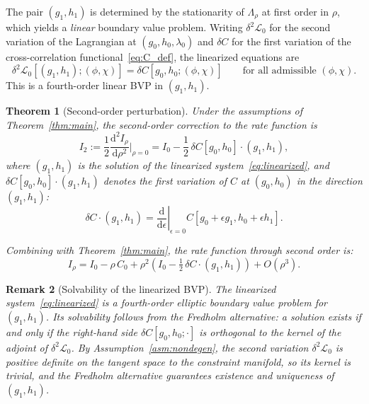 \documentclass[11pt]{article}
\newtheorem{theorem}{Theorem}
\newtheorem{remark}[theorem]{Remark}
\theoremstyle{definition}
\newcommand{\dd}{\mathrm{d}}
\begin{document}
The pair $(g_1, h_1)$ is determined by the stationarity of $\Lambda_\rho$ at first order in $\rho$, which yields a \emph{linear} boundary value problem. Writing $\delta^2 \mathcal{L}_0$ for the second variation of the Lagrangian at $(g_0, h_0, \lambda_0)$ and $\delta C$ for the first variation of the cross-correlation functional~\eqref{eq:C_def}, the linearized equations are
\begin{equation}\label{eq:linearized}
  \delta^2\mathcal{L}_0[(g_1, h_1); (\phi, \chi)] = \delta C[g_0, h_0; (\phi, \chi)] \qquad \text{for all admissible } (\phi, \chi).
\end{equation}
This is a fourth-order linear BVP in $(g_1, h_1)$.

\begin{theorem}[Second-order perturbation]\label{thm:second_order}
Under the assumptions of Theorem~\ref{thm:main}, the second-order correction to the rate function is
\begin{equation}\label{eq:I2}
  I_2 := \frac{1}{2}\frac{\dd^2 I_\rho}{\dd\rho^2}\bigg|_{\rho=0} = I_0 - \frac{1}{2}\,\delta C[g_0, h_0]\cdot(g_1, h_1),
\end{equation}
where $(g_1, h_1)$ is the solution of the linearized system~\eqref{eq:linearized}, and $\delta C[g_0,h_0]\cdot(g_1,h_1)$ denotes the first variation of $C$ at $(g_0,h_0)$ in the direction $(g_1,h_1)$:
\begin{equation}\label{eq:delta_C}
  \delta C \cdot (g_1, h_1) = \left.\frac{\dd}{\dd\epsilon}\right|_{\epsilon=0} C[g_0 + \epsilon g_1, h_0 + \epsilon h_1].
\end{equation}

Combining with Theorem~\ref{thm:main}, the rate function through second order is:
\begin{equation}\label{eq:Irho_2nd}
  I_\rho = I_0 - \rho\,C_0 + \rho^2\!\left(I_0 - \tfrac{1}{2}\,\delta C\cdot(g_1,h_1)\right) + O(\rho^3).
\end{equation}
\end{theorem}

\begin{remark}[Solvability of the linearized BVP]\label{rem:solvability}
The linearized system~\eqref{eq:linearized} is a fourth-order elliptic boundary value problem for $(g_1, h_1)$. Its solvability follows from the Fredholm alternative: a solution exists if and only if the right-hand side $\delta C[g_0, h_0; \cdot]$ is orthogonal to the kernel of the adjoint of $\delta^2 \mathcal{L}_0$. By Assumption~\ref{asm:nondegen}, the second variation $\delta^2\mathcal{L}_0$ is positive definite on the tangent space to the constraint manifold, so its kernel is trivial, and the Fredholm alternative guarantees existence and uniqueness of $(g_1, h_1)$.
\end{remark}
\end{document}

